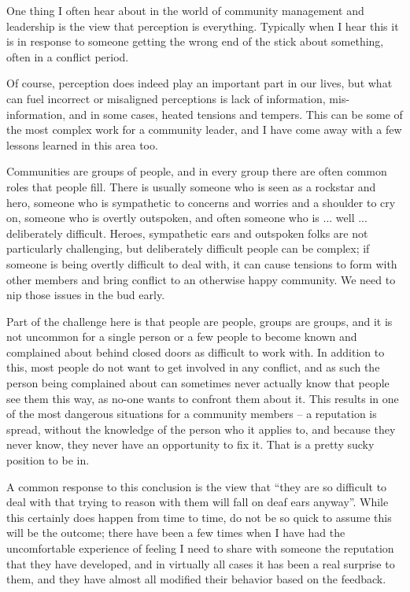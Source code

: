 One thing I often hear about in the world of community management and leadership
is the view that perception is everything. Typically when I hear this it is in
response to someone getting the wrong end of the stick about something, often in
a conflict period.

Of course, perception does indeed play an important part in our lives, but what
can fuel incorrect or misaligned perceptions is lack of information,
mis-information, and in some cases, heated tensions and tempers. This can be
some of the most complex work for a community leader, and I have come away with
a few lessons learned in this area too.

Communities are groups of people, and in every group there are often common
roles that people fill. There is usually someone who is seen as a rockstar and
hero, someone who is sympathetic to concerns and worries and a shoulder to cry
on, someone who is overtly outspoken, and often someone who is ... well ...
deliberately difficult. Heroes, sympathetic ears and outspoken folks are not
particularly challenging, but deliberately difficult people can be complex; if
someone is being overtly difficult to deal with, it can cause tensions to form
with other members and bring conflict to an otherwise happy community. We need
to nip those issues in the bud early.

Part of the challenge here is that people are people, groups are groups, and it
is not uncommon for a single person or a few people to become known and
complained about behind closed doors as difficult to work with. In addition to
this, most people do not want to get involved in any conflict, and as such the
person being complained about can sometimes never actually know that people see
them this way, as no-one wants to confront them about it. This results in one of
the most dangerous situations for a community members -- a reputation is spread,
without the knowledge of the person who it applies to, and because they never
know, they never have an opportunity to fix it. That is a pretty sucky position
to be in.

A common response to this conclusion is the view that ``they are so difficult to
deal with that trying to reason with them will fall on deaf ears anyway''. While
this certainly does happen from time to time, do not be so quick to assume this
will be the outcome; there have been a few times when I have had the
uncomfortable experience of feeling I need to share with someone the reputation
that they have developed, and in virtually all cases it has been a real surprise
to them, and they have almost all modified their behavior based on the feedback.

